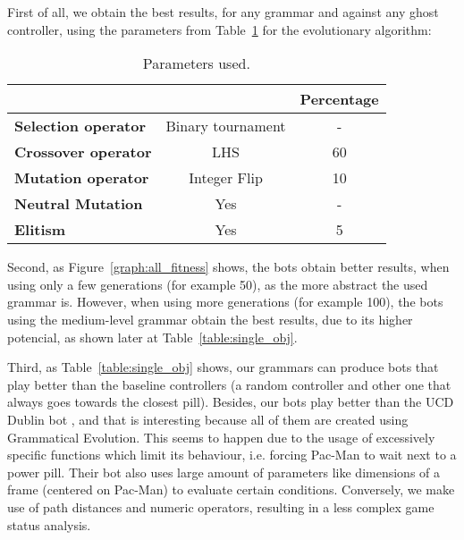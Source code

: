 First of all, we obtain the best results, for any grammar and against any ghost controller, using the parameters from Table~\ref{table:best-params-en} for the evolutionary algorithm:
\begin{table}[H]
\centering
\begin{tabular}{lc|c|}
\cline{3-3}
                                                   &                                                               & \textbf{Percentage} \\ \hline
\multicolumn{1}{|l|}{\textbf{Selection operator}} & Binary tournament \footnotemark & -                   \\ \hline
\multicolumn{1}{|l|}{\textbf{Crossover operator}}     & LHS                                                           & 60                  \\ \hline
\multicolumn{1}{|l|}{\textbf{Mutation operator}}  & Integer Flip                                                  & 10                  \\ \hline
\multicolumn{1}{|l|}{\textbf{Neutral Mutation}}    & Yes                                                            & -                   \\ \hline
\multicolumn{1}{|l|}{\textbf{Elitism}}            & Yes                                                            & 5                   \\ \hline
\end{tabular}
\label{table:best-params-en}
\caption{Parameters used.}
\end{table}

Second, as Figure~\ref{graph:all_fitness} shows, the bots obtain better results, when using only a few generations (for example 50), as the more abstract the used grammar is. However, when using more generations (for example 100), the bots using the medium-level grammar obtain the best results, due to its higher potencial, as shown later at Table~\ref{table:single_obj}.
 
Third, as Table~\ref{table:single_obj} shows, our grammars can produce bots that play better than the baseline controllers (a random controller and other one that always goes towards the closest pill). Besides, our bots play better than the UCD Dublin bot \cite{galvan2010evolving}, and that is interesting because all of them are created using Grammatical Evolution. This seems to happen due to the usage of excessively specific functions which limit its behaviour, i.e. forcing Pac-Man to wait next to a power pill. Their bot also uses large amount of parameters like dimensions of a frame (centered on Pac-Man) to evaluate certain conditions. Conversely, we make use of path distances and numeric operators, resulting in a less complex game status analysis.


